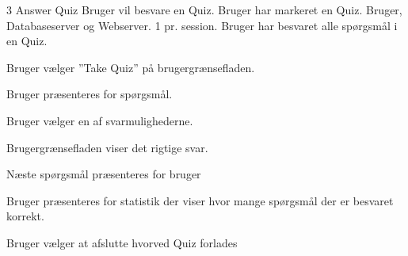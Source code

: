 \uchead
	{3}
	{Answer Quiz}
	{Bruger vil besvare en Quiz.}
	{Bruger har markeret en Quiz.}
	{Bruger, Databaseserver og Webserver.}
	{}
	{1 pr. session.}
	{Bruger har besvaret alle spørgsmål i en Quiz.}

\item Bruger vælger ''Take Quiz'' på brugergrænsefladen.

\item\label{ucAnswerQuizPresent} Bruger præsenteres for spørgsmål.

\item Bruger vælger en af svarmulighederne. 

\item Brugergrænsefladen viser det rigtige svar.

\item\label{ucAnswerQuizEnd} Næste spørgsmål præsenteres for bruger 

\item Bruger præsenteres for statistik der viser hvor mange spørgsmål der er besvaret korrekt.

\item Bruger vælger at afslutte hvorved Quiz forlades

\ucdescriptionend
{}